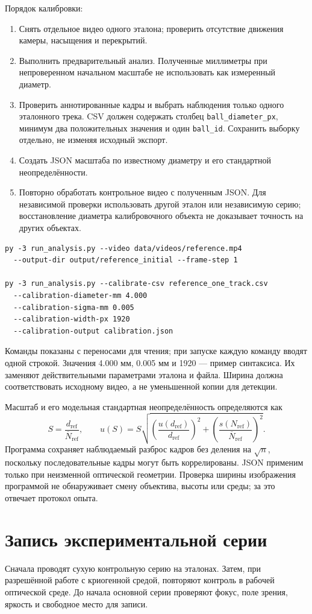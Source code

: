 \documentclass[12pt,a4paper]{article}
\begin{document}
Порядок калибровки:
\begin{enumerate}
\item Снять отдельное видео одного эталона; проверить отсутствие движения камеры, насыщения и перекрытий.
\item Выполнить предварительный анализ. Полученные миллиметры при непроверенном начальном масштабе не использовать как измеренный диаметр.
\item Проверить аннотированные кадры и выбрать наблюдения только одного эталонного трека. CSV должен содержать столбец \texttt{ball\_diameter\_px}, минимум два положительных значения и один \texttt{ball\_id}. Сохранить выборку отдельно, не изменяя исходный экспорт.
\item Создать JSON масштаба по известному диаметру и его стандартной неопределённости.
\item Повторно обработать контрольное видео с полученным JSON. Для независимой проверки использовать другой эталон или независимую серию; восстановление диаметра калибровочного объекта не доказывает точность на других объектах.
\end{enumerate}
\begin{verbatim}
py -3 run_analysis.py --video data/videos/reference.mp4
  --output-dir output/reference_initial --frame-step 1

py -3 run_analysis.py --calibrate-csv reference_one_track.csv
  --calibration-diameter-mm 4.000
  --calibration-sigma-mm 0.005
  --calibration-width-px 1920
  --calibration-output calibration.json
\end{verbatim}
Команды показаны с переносами для чтения; при запуске каждую команду вводят одной строкой. Значения 4.000 мм, 0.005 мм и 1920 --- пример синтаксиса. Их заменяют действительными параметрами эталона и файла. Ширина должна соответствовать исходному видео, а не уменьшенной копии для детекции.

Масштаб и его модельная стандартная неопределённость определяются как
\[
S=\frac{d_{\mathrm{ref}}}{\overline{N}_{\mathrm{ref}}},\qquad
u(S)=S\sqrt{\left(\frac{u(d_{\mathrm{ref}})}{d_{\mathrm{ref}}}\right)^2+
\left(\frac{s(N_{\mathrm{ref}})}{\overline{N}_{\mathrm{ref}}}\right)^2}.
\]
Программа сохраняет наблюдаемый разброс кадров без деления на $\sqrt n$, поскольку последовательные кадры могут быть коррелированы. JSON применим только при неизменной оптической геометрии. Проверка ширины изображения программой не обнаруживает смену объектива, высоты или среды; за это отвечает протокол опыта.

\section{Запись экспериментальной серии}
Сначала проводят сухую контрольную серию на эталонах. Затем, при разрешённой работе с криогенной средой, повторяют контроль в рабочей оптической среде. До начала основной серии проверяют фокус, поле зрения, яркость и свободное место для записи.
\end{document}

